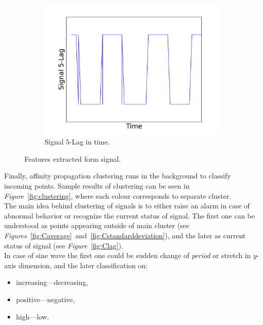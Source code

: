 \documentclass[11pt, letterpaper]{article}            %
\begin{document}
\begin{figure}[htbp]
  ~ %
  \begin{subfigure}[b]{0.49\textwidth}
    \includegraphics[width=\textwidth]{./gfx/feature3-1.png}
    \caption{Signal $5$-Lag in time.\label{fig:lag}}
  \end{subfigure}
  \caption{Features extracted form signal.\label{fig:features}}
\end{figure}

Finally, affinity propagation clustering runs in the background to classify incoming points. Sample results of clustering can be seen in \emph{Figure}~\ref{fig:clustering}, where each colour corresponds to separate cluster.\\
The main idea behind clustering of signals is to either raise an alarm in case of abnormal behavior or recognize the current status of signal. The first one can be understood as points appearing outside of main cluster (see \emph{Figures}~\ref{fig:Caverage}~and~\ref{fig:Cstandarddeviation}), and the later as current status of signal (see \emph{Figure}~\ref{fig:Clag}).\\
In case of sine wave the first one could be sudden change of \emph{period} or stretch in $y$-axis dimension, and the later classification on:
\begin{itemize}
  \item increasing---decreasing,
  \item positive---negative,
  \item high---low.
\end{itemize}
\end{document}
